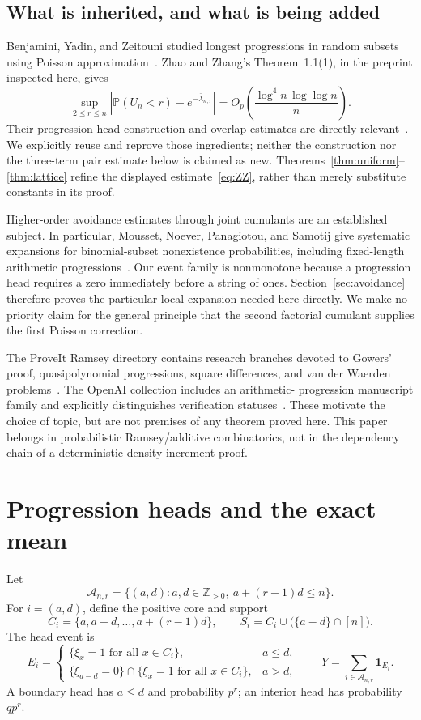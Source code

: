 \documentclass[11pt]{article}
\theoremstyle{definition}\newtheorem{definition}[theorem]{Definition}
\theoremstyle{remark}\newtheorem{remark}[theorem]{Remark}
\newcommand{\PP}{\mathbb P}
\newcommand{\ind}{\mathbf 1}
\newcommand{\AP}{\mathcal A}
\newcommand{\la}{\lambda}
\begin{document}
\subsection{What is inherited, and what is being added}
Benjamini, Yadin, and Zeitouni studied longest progressions in random
subsets using Poisson approximation~\cite{BYZ}.
Zhao and Zhang's Theorem~1.1(1), in the preprint inspected here, gives
\begin{equation}
 \sup_{2\le r\le n}|\PP(U_n<r)-e^{-\bar\la_{n,r}}|
 =O_p\!\left(\frac{\log^4 n\,\log\log n}{n}\right).
 \label{eq:ZZ}
\end{equation}
Their progression-head construction and overlap estimates are directly
relevant~\cite{ZZ}. We explicitly reuse and reprove those ingredients;
neither the construction nor the three-term pair estimate below is
claimed as new. Theorems~\ref{thm:uniform}--\ref{thm:lattice} refine the
displayed estimate~\eqref{eq:ZZ}, rather than merely substitute constants
in its proof.

Higher-order avoidance estimates through joint cumulants are an established
subject. In particular, Mousset, Noever, Panagiotou, and Samotij give
systematic expansions for binomial-subset nonexistence probabilities,
including fixed-length arithmetic progressions~\cite{MNPS}.
Our event family is nonmonotone because a progression head requires a
zero immediately before a string of ones. Section~\ref{sec:avoidance}
therefore proves the particular local expansion needed here directly.
We make no priority claim for the general principle that the second
factorial cumulant supplies the first Poisson correction.

The ProveIt Ramsey directory contains research branches devoted to Gowers'
proof, quasipolynomial progressions, square differences, and van der Waerden
problems~\cite{ProveIt}. The OpenAI collection includes an arithmetic-
progression manuscript family and explicitly distinguishes verification
statuses~\cite{OpenAIMath,OpenAIAP}. These motivate the choice of topic,
but are not premises of any theorem proved here. This paper belongs in
probabilistic Ramsey/additive combinatorics, not in the dependency chain
of a deterministic density-increment proof.

\section{Progression heads and the exact mean}\label{sec:heads}
Let
\[
 \AP_{n,r}=\{(a,d):a,d\in\mathbb Z_{>0},\ a+(r-1)d\le n\}.
\]
For $i=(a,d)$, define the positive core and support
\[
 C_i=\{a,a+d,\ldots,a+(r-1)d\},\qquad
 S_i=C_i\cup\bigl(\{a-d\}\cap[n]\bigr).
\]
The head event is
\begin{equation}
 E_i=\begin{cases}
       \{\xi_x=1\text{ for all }x\in C_i\},&a\le d,\\
       \{\xi_{a-d}=0\}\cap\{\xi_x=1\text{ for all }x\in C_i\},&a>d,
     \end{cases}
 \qquad Y=\sum_{i\in\AP_{n,r}}\ind_{E_i}.
 \label{eq:head}
\end{equation}
A boundary head has $a\le d$ and probability $p^r$; an interior head has
probability $qp^r$.
\end{document}
